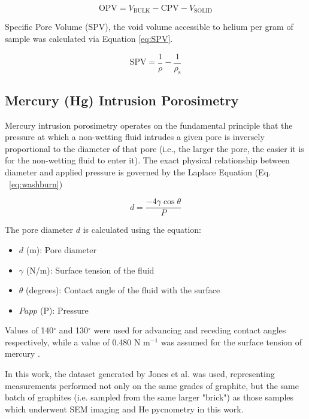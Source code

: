 \documentclass[3p,twocolumn]{elsarticle}
\begin{document}
\begin{equation}
	\mathrm{OPV} = V_{\mathrm{BULK}} - \mathrm{CPV} - V_{\mathrm{SOLID}}\label{eq:OPV} 
\end{equation}

Specific Pore Volume (SPV), the void volume accessible to helium per gram of
sample was calculated via Equation \ref{eq:SPV}. 

\begin{equation}
\mathrm{SPV} = \frac{1}{\rho}-\frac{1}{\rho_\mathrm{s}}\label{eq:SPV} 
\end{equation}

\subsection{Mercury (Hg) Intrusion Porosimetry}
Mercury intrusion porosimetry operates on the fundamental principle that the
pressure at which a non-wetting fluid intrudes a given pore is inversely
proportional to the diameter of that pore (i.e., the larger the pore, the easier
it is for the non-wetting fluid to enter it). The exact physical relationship
between diameter and applied pressure is governed by the Laplace Equation (Eq.
~\ref{eq:washburn})
	
	\begin{equation} \label{eq:washburn}
		d = \frac{-4\gamma \cos \theta}{P}
	\end{equation}

		The pore diameter \(d\) is calculated using the equation:
	\begin{itemize}
		\item $d$ (m): Pore diameter
		\item $\gamma$ (N/m): Surface tension of the fluid
		\item $\theta$ (degrees): Contact angle of the fluid with the surface
		\item $Papp$ (P): Pressure
	\end{itemize}

Values of 140$^{\circ}$ and 130$^{\circ}$ were used for advancing and receding
contact angles respectively, while a value of 0.480 N m$^{-1}$ was assumed for the
surface tension of mercury \citep{VANBRAKEL19811}.  

In this work, the dataset generated by Jones et al. \citep{Jones2018} was used,
representing measurements performed not only on the same grades of graphite, but
the same batch of graphites (i.e. sampled from the same larger "brick") as those samples
which underwent SEM imaging and He pycnometry in this work.
\end{document}
